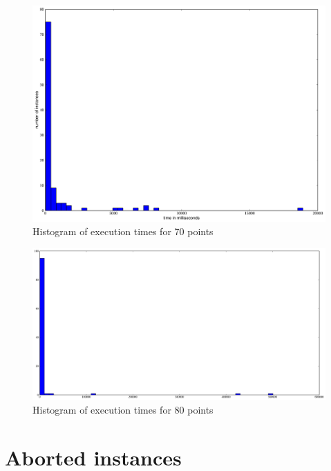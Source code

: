 \begin{landscape}
\begin{figure}[ht]
  \centering
  \includegraphics[width=\linewidth,height=\textheight,keepaspectratio]{results/time_hist_70.pdf}
  \caption{\label{fig:times_70}Histogram of execution times for 70 points}
\end{figure}

\begin{figure}[ht]
  \centering
  \includegraphics[width=\linewidth,height=\textheight,keepaspectratio]{results/time_hist_80.pdf}
  \caption{\label{fig:times_80}Histogram of execution times for 80 points}
\end{figure}
\end{landscape}
\restoregeometry

\section{Aborted instances}

